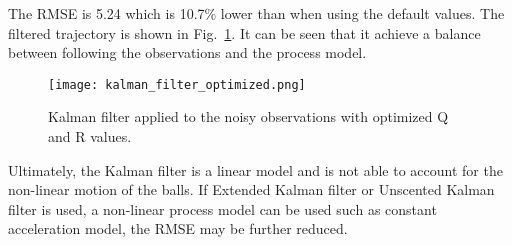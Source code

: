\documentclass{report}
\begin{document}
The RMSE is 5.24 which is 10.7\% lower than when using the default values. The filtered trajectory is shown in Fig.~\ref{fig:kalman_filter_optimized}. It can be seen that it achieve a balance between following the observations and the process model.

\begin{figure}[ht]
    \centering
    \texttt{[image: kalman\_filter\_optimized.png]}
    \caption{Kalman filter applied to the noisy observations with optimized Q and R values.}
    \label{fig:kalman_filter_optimized}
\end{figure}

Ultimately, the Kalman filter is a linear model and is not able to account for the non-linear motion of the balls. If Extended Kalman filter or Unscented Kalman filter is used, a non-linear process model can be used such as constant acceleration model, the RMSE may be further reduced.

\printbibliography
\end{document}
